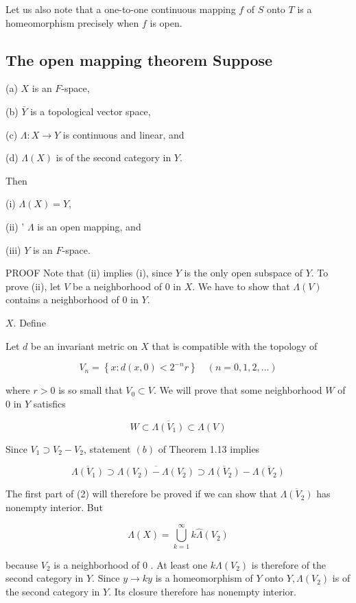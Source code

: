\documentclass[10pt]{article}
\begin{document}
Let us also note that a one-to-one continuous mapping $f$ of $S$ onto $T$ is a homeomorphism precisely when $f$ is open.

\subsection{The open mapping theorem Suppose}
(a) $X$ is an $F$-space,

(b) $\bar{Y}$ is a topological vector space,

(c) $\Lambda: X \rightarrow Y$ is continuous and linear, and

(d) $\Lambda(X)$ is of the second category in $Y$.

Then

(i) $\Lambda(X)=Y$,

(ii) ' $\Lambda$ is an open mapping, and

(iii) $Y$ is an $F$-space.

PROOF Note that (ii) implies (i), since $Y$ is the only open subspace of $Y$. To prove (ii), let $V$ be a neighborhood of 0 in $X$. We have to show that $\Lambda(V)$ contains a neighborhood of 0 in $Y$.

$X$. Define

Let $d$ be an invariant metric on $X$ that is compatible with the topology of

$$
V_{n}=\left\{x: d(x, 0)<2^{-n} r\right\} \quad(n=0,1,2, \ldots)
$$

where $r>0$ is so small that $V_{0} \subset V$. We will prove that some neighborhood $W$ of 0 in $Y$ satisfics

$$
W \subset \overline{\Lambda\left(V_{1}\right)} \subset \Lambda(V)
$$

Since $V_{1} \supset V_{2}-V_{2}$, statement $(b)$ of Theorem 1.13 implies

$$
\overline{\Lambda\left(V_{1}\right)} \supset \overline{\Lambda\left(V_{2}\right)-\Lambda\left(V_{2}\right)} \supset \overline{\Lambda\left(V_{2}\right)}-\overline{\Lambda\left(V_{2}\right)}
$$

The first part of (2) will therefore be proved if we can show that $\overline{\Lambda\left(V_{2}\right)}$ has
nonempty interior. But

$$
\Lambda(X)=\bigcup_{k=1}^{\infty} k \hat{\Lambda}\left(V_{2}\right)
$$

because $V_{2}$ is a neighborhood of 0 . At least one $k \Lambda\left(V_{2}\right)$ is therefore of the second category in $Y$. Since $y \rightarrow k y$ is a homeomorphism of $Y$ onto $Y, \Lambda\left(V_{2}\right)$ is of the second category in $Y$. Its closure therefore has nonempty interior.
\end{document}
